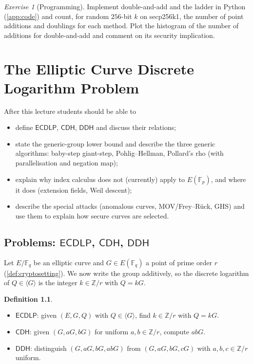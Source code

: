 \documentclass[11pt,a4paper,oneside]{book}
\theoremstyle{plain}
\theoremstyle{definition}
\newtheorem{definition}[theorem]{Definition}
\theoremstyle{remark}
\newtheorem{exercise}{Exercise}[chapter]
\newcommand{\Z}{\mathbb{Z}}
\newcommand{\F}{\mathbb{F}}
\newcommand{\Fq}{\mathbb{F}_q}
\newcommand{\ECDLP}{\mathsf{ECDLP}}
\newcommand{\CDH}{\mathsf{CDH}}
\newcommand{\DDH}{\mathsf{DDH}}
\begin{document}
\begin{exercise}[Programming]
Implement double-and-add and the ladder in Python (\cref{app:code}) and count, for random $256$-bit $k$ on secp256k1, the number of point additions and doublings for each method. Plot the histogram of the number of additions for double-and-add and comment on its security implication.
\end{exercise}
\chapter{The Elliptic Curve Discrete Logarithm Problem}\label{ch:L3}

\begin{goalsbox}
After this lecture students should be able to
\begin{itemize}[nosep]
\item define $\ECDLP$, $\CDH$, $\DDH$ and discuss their relations;
\item state the generic-group lower bound and describe the three generic algorithms: baby-step giant-step, Pohlig--Hellman, Pollard's rho (with parallelisation and negation map);
\item explain why index calculus does not (currently) apply to $E(\F_p)$, and where it does (extension fields, Weil descent);
\item describe the special attacks (anomalous curves, MOV/Frey--R\"uck, GHS) and use them to explain how secure curves are selected.
\end{itemize}
\end{goalsbox}

\section{Problems: \texorpdfstring{$\ECDLP$, $\CDH$, $\DDH$}{ECDLP, CDH, DDH}}\label{sec:cdh-ddh}

Let $E/\Fq$ be an elliptic curve and $G\in E(\Fq)$ a point of prime order $r$ (\cref{def:cryptosetting}). We now write the group additively, so the discrete logarithm of $Q\in\langle G\rangle$ is the integer $k\in\Z/r$ with $Q=kG$.

\begin{definition}\label{def:ecdlp}
\begin{itemize}[nosep]
\item $\ECDLP$: given $(E,G,Q)$ with $Q\in\langle G\rangle$, find $k\in\Z/r$ with $Q=kG$.
\item $\CDH$: given $(G,aG,bG)$ for uniform $a,b\in\Z/r$, compute $abG$.
\item $\DDH$: distinguish $(G,aG,bG,abG)$ from $(G,aG,bG,cG)$ with $a,b,c\in\Z/r$ uniform.
\end{itemize}
\end{definition}
\end{document}
